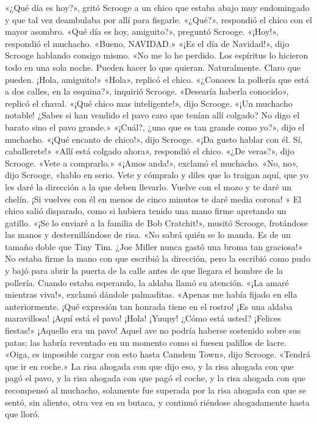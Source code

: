 \documentclass{novela}
\begin{document}
 «¿Qué día es hoy?», gritó Scrooge a un chico que estaba abajo muy endomingado y que tal vez deambulaba por allí para fisgarle.
 «¿Qué?», respondió el chico con el mayor asombro.
 «Qué día es hoy, amiguito?», preguntó Scrooge.
 «¡Hoy!», respondió el muchacho. «Bueno, NAVIDAD.»
 «¡Es el día de Navidad!», dijo Scrooge hablando consigo mismo. «No me lo he perdido. Los espíritus lo hicieron todo en una sola noche. Pueden hacer lo que quieran. Naturalmente. Claro que pueden. ¡Hola, amiguito!»
 «Hola», replicó el chico.
 «¿Conoces la pollería que está a dos calles, en la esquina?», inquirió Scrooge.
 «Desearía haberla conocido», replicó el chaval.
 «¡Qué chico mas inteligente!», dijo Scrooge. «¡Un muchacho notable! ¿Sabes si han vendido el pavo caro que tenían allí colgado? No digo el barato sino el pavo grande.»
 «¡Cuál?, ¿uno que es tan grande como yo?», dijo el muchacho.
 «¡Qué encanto de chico!», dijo Scrooge. «¡Da gusto hablar con él. Sí, caballerete!»
 «Allí está colgado ahora», respondió el chico.
 «¿De veras?», dijo Scrooge. «Vete a comprarlo.»
 «¡Amos anda!», exclamó el muchacho.
 «No, no», dijo Scrooge, «hablo en serio. Vete y cómpralo y diles que lo traigan aquí, que yo les daré la dirección a la que deben llevarlo. Vuelve con el mozo y te daré un chelín. ¡Si vuelves con él en menos de cinco minutos te daré media corona! »
 El chico salió disparado, como si hubiera tenido una mano firme apretando un gatillo.
 «¡Se lo enviaré a la familia de Bob Cratchit!», musitó Scrooge, frotándose las manos y desternillándose de risa. «No sabrá quién se lo manda. Es de un tamaño doble que Tiny Tim. ¿Joe Miller nunca gastó una broma tan graciosa!»
 No estaba firme la mano con que escribió la dirección, pero la escribió como pudo y bajó para abrir la puerta de la calle antes de que llegara el hombre de la pollería. Cuando estaba esperando, la aldaba llamó su atención.
 «¡La amaré mientras viva!», exclamó dándole palmaditas. «Apenas me había fijado en ella anteriormente. ¡Qué expresión tan honrada tiene en el rostro! ¡Es una aldaba maravillosa! ¡Aquí está el pavo! ¡Hola! ¡Yuupy! ¿Cómo está usted? ¡Felices fiestas!»
 ¡Aquello era un pavo! Aquel ave no podría haberse sostenido sobre sus patas; las habría reventado en un momento como si fuesen palillos de lacre.
 «Oiga, es imposible cargar con esto hasta Camdem Town», dijo Scrooge. «Tendrá que ir en coche.»
 La risa ahogada con que dijo eso, y la risa ahogada con que pagó el pavo, y la risa ahogada con que pagó el coche, y la risa ahogada con que recompensó al muchacho, solamente fue superada por la risa ahogada con que se sentó, sin aliento, otra vez en su butaca, y continuó riéndose ahogadamente hasta que lloró.
\end{document}

